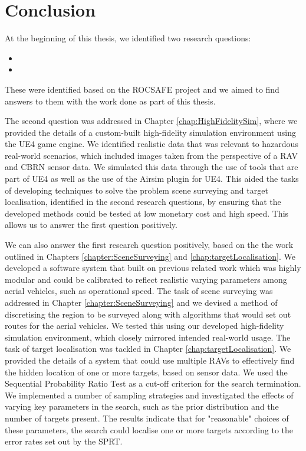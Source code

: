 
\chapter{Conclusion}
At the beginning of this thesis, we identified two research questions: 
\begin{itemize}
    \item  
    \item 
\end{itemize}
These were identified based on the ROCSAFE project and we aimed to find answers to them with the work done as part of this thesis.

\par The second question was addressed in Chapter \ref{chap:HighFidelitySim}, where we provided the details of a custom-built high-fidelity simulation environment using the UE4 game engine. We identified realistic data that was relevant to hazardous real-world scenarios, which included images taken from the perspective of a RAV and CBRN sensor data. We simulated this data through the use of tools that are part of UE4 as well as the use of the Airsim \cite{Shah2017AirSim:Vehicles} plugin for UE4. This aided the tasks of developing techniques to solve the problem scene surveying and target localisation, identified in the second research questions, by ensuring that the developed methods could be tested at low monetary cost and high speed. This allows us to answer the first question positively.

\par We can also answer the first research question positively, based on the the work outlined in Chapters \ref{chapter:SceneSurveying} and \ref{chap:targetLocalisation}. We developed a software system that built on previous related work which was highly modular and could be calibrated to reflect realistic varying parameters among aerial vehicles, such as operational speed. The task of scene surveying was addressed in Chapter \ref{chapter:SceneSurveying} and we devised a method of discretising the region to be surveyed along with algorithms that would set out routes for the aerial vehicles. We tested this using our developed high-fidelity simulation environment, which closely mirrored intended real-world usage. The task of target localisation was tackled in Chapter \ref{chap:targetLocalisation}. We provided the details of a system that could use multiple RAVs to effectively find the hidden location of one or more targets, based on sensor data. We used the Sequential Probability Ratio Test as a cut-off criterion for the search termination. We implemented a number of sampling strategies and investigated the effects of varying key parameters in the search, such as the prior distribution and the number of targets present. The results indicate that for "reasonable" choices of these parameters, the search could localise one or more targets according to the error rates set out by the SPRT. 
